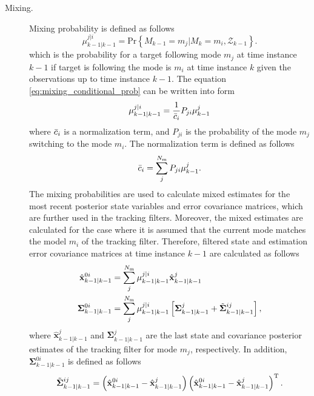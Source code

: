 \documentclass[english, 12pt, a4paper, elec, utf8, a-1b, online]{aaltothesis}
\renewcommand{\vec}[1]{\mathbf{#1}}
\renewcommand{\Pr}[1]{\text{Pr}\left\{ #1 \right\}}
\newcommand{\transpose}[1]{#1^\text{T}}
\newcommand{\lastmxprobs}{\mu^{j|i}_{k-1|k-1}}
\newcommand{\mxnorm}{ \Bar{c}_i }
\newcommand{\xmxinit}{\hat{\vec{x}}^{0i}_{k-1|k-1}}
\newcommand{\ecovmxinit}{\bm{\Sigma}^{0i}_{k-1|k-1}}
\newcommand{\modexlast}{\hat{\vec{x}}^{j}_{k-1|k-1}}
\newcommand{\modecovlast}{\bm{\Sigma}^j_{k-1|k-1}}
\newcommand{\modemxcovlast}{\Tilde{\bm{\Sigma}}^{ij}_{k-1|k-1}}
\newcommand{\nmodels}{{N_\text{m}}}
\begin{document}
\begin{description}
\item[Mixing.]

Mixing probability is defined as follows
\begin{equation}\label{eq:mixing_conditional_prob}
    \lastmxprobs = \Pr{M_{k-1}=m_j|M_{k}=m_i, \mathcal{Z}_{k-1}}.
\end{equation}
which is the probability for a target following mode $m_j$ at time instance $k-1$ if target is following the mode is $m_i$ at time instance $k$ given the observations up to time instance $k-1$.
The equation \eqref{eq:mixing_conditional_prob} can be written into form
\begin{equation}
    \lastmxprobs = \frac{1}{\mxnorm} P_{ji} \mu^j_{k-1} \label{eq:imm_mx_probs}
\end{equation}
where $\mxnorm$ is a normalization term, and $P_{ji}$ is the probability of the mode $m_j$ switching to the mode $m_i$. 
The normalization term is defined as follows
\begin{equation}
    \mxnorm = \sum_j^\nmodels P_{ji} \mu^j_{k-1}. \label{eq:imm_mx_normalization}
\end{equation}
The mixing probabilities are used to calculate mixed estimates for the most recent posterior state variables and error covariance matrices, which are further used in the tracking filters.
Moreover, the mixed estimates are calculated for the case where it is assumed that the current mode matches the model $m_i$ of the tracking filter.
Therefore, filtered state and estimation error covariance matrices at time instance $k-1$ are calculated as follows
\begin{subequations}
\begin{align}
    \xmxinit &= \sum_j^\nmodels \lastmxprobs \modexlast \label{eq:imm_mx_init_x}\\
    \ecovmxinit &= \sum_j^\nmodels \lastmxprobs \left[ \modecovlast + \modemxcovlast \right], \label{eq:imm_mx_init_P}
\end{align}
\end{subequations}
where $\modexlast$ and $\modecovlast$ are the last state and covariance posterior estimates of the tracking filter for mode $m_j$, respectively. 
In addition, $\ecovmxinit$ is defined as follows
\begin{equation}
    \modemxcovlast = 
    \left( \xmxinit - \modexlast  \right) 
    \transpose{\left( \xmxinit - \modexlast   \right)}.\label{eq:imm_mx_init_Ptilde}
\end{equation}


\end{description}
\end{document}
